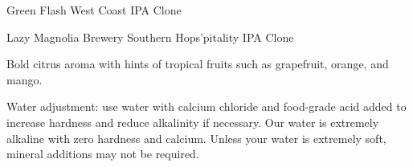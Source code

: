 \begin{recipe}{Green Flash West Coast IPA Clone}
\begin{ingredientsblock}

\end{ingredientsblock}

\end{recipe}

\begin{recipe}{Lazy Magnolia Brewery Southern Hops'pitality IPA Clone}

\begin{aboutblock}
Bold citrus aroma with hints of tropical fruits such as grapefruit, orange,
and mango. \sourceaha
\end{aboutblock}


\begin{methodandtiming}
 
\begin{mashsteps}
\end{mashsteps}

\begin{fermentationsteps}
\end{fermentationsteps}

\begin{directions}
Water adjustment: use water with calcium chloride and food-grade acid added to
increase hardness and reduce alkalinity if necessary. Our water is extremely
alkaline with zero hardness and calcium. Unless your water is extremely soft,
mineral additions may not be required.
\end{directions}

\end{methodandtiming}

\recipebreak

\begin{ingredientsblock}

\begin{malts}
\end{malts}

\begin{hops}
\end{hops}


\end{ingredientsblock}
\end{recipe}
